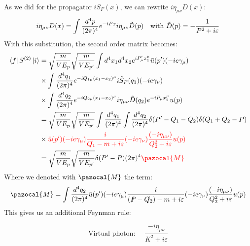 \documentclass[../main.tex]{subfiles}
\begin{document}
As we did for the propagator $iS_F(x)$, we can rewrite $i\eta_{\mu\nu}D(x)$:
\[
i\eta_{\mu\nu}D(x)=\int\frac{d^4p}{(2\pi)^4}e^{-iPx}i\eta_{\mu\nu}\Tilde{D}(p) \quad \text{with } \Tilde{D}(p)=-\frac{1}{P^2+i\varepsilon}
\]
With this substitution, the second order matrix becomes:
\begin{align*}
\bra{f}S^{(2)}\ket{i}&=\sqrt{\frac{m}{VE_p}}\sqrt{\frac{m}{VE_{p'}}}\int d^4x_1d^4x_2e^{iP'_\mu x_1^\mu}\bar{u}(p')(-ie\gamma_\mu)\\
&\times\int\frac{d^4q_1}{(2\pi)^4}e^{-iQ_{1\mu}(x_1-x_2)^\mu}i\Tilde{S}_F(q_1)(-ie\gamma_\nu)\\
&\times\int\frac{d^4q_2}{(2\pi)^4}e^{-iQ_{2\mu}(x_1-x_2)^\mu}i\eta_{\mu\nu}\Tilde{D}(q_2)e^{-iP_\mu x_2^\mu}u(p)\\
&=\sqrt{\frac{m}{VE_p}}\sqrt{\frac{m}{VE_{p'}}}\int\frac{d^4q_1}{(2\pi)^4}\int\frac{d^4q_2}{(2\pi)^4}\delta(P'-Q_1-Q_2)\delta(Q_1+Q_2-P)\\
&\times{\color{red}\bar{u}(p')(-ie\gamma_\mu)\frac{i}{\slashed{Q_1}-m+i\varepsilon}(-ie\gamma_\nu)\frac{(-i\eta_{\mu\nu})}{Q_2^2+i\varepsilon}u(p)}\\
&=\sqrt{\frac{m}{VE_p}}\sqrt{\frac{m}{VE_{p'}}}\delta(P'-P)(2\pi)^4{\color{red}\pazocal{M}} 
\end{align*}
Where we denoted with $\pazocal{M}$ the term:
\[
\pazocal{M}=\int\frac{d^4q_2}{(2\pi)^4}\bar{u}(p')(-ie\gamma_\mu)\frac{i}{(\slashed{P}-\slashed{Q_2})-m+i\varepsilon}(-ie\gamma_\nu)\frac{(-i\eta_{\mu\nu})}{Q_2^2+i\varepsilon}u(p)
\]
This gives us an additional Feynman rule:
\begin{kaobox}[frametitle=Feynman rules]
\[
\text{Virtual photon: }\quad \frac{-i\eta_{\mu\nu}}{K^2+i\varepsilon}
\]
\end{kaobox}
\end{document}
